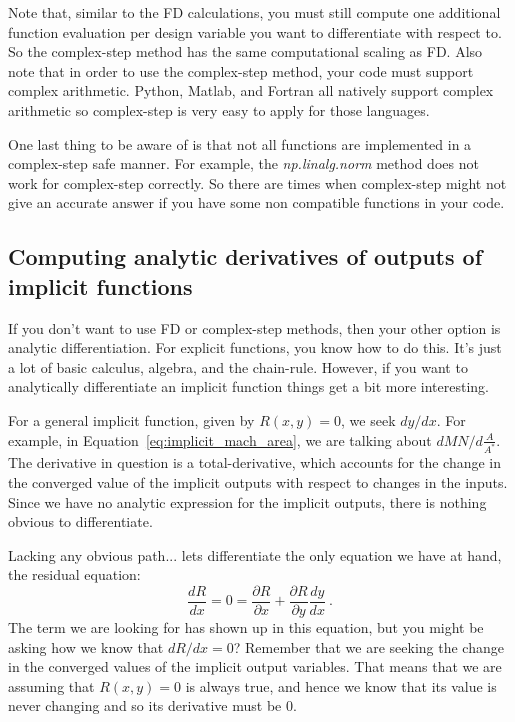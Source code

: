 \documentclass[conf]{new-aiaa}
\begin{document}
    Note that, similar to the FD calculations, you must still compute one additional function evaluation per design variable you want to differentiate with respect to. 
    So the complex-step method has the same computational scaling as FD. 
    Also note that in order to use the complex-step method, your code must support complex arithmetic. 
    Python, Matlab, and Fortran all natively support complex arithmetic so complex-step is very easy to apply for those languages. 

    One last thing to be aware of is that not all functions are implemented in a complex-step safe manner. 
    For example, the \textit{np.linalg.norm} method does not work for complex-step correctly. 
    So there are times when complex-step might not give an accurate answer if you have some non compatible functions in your code. 




    \subsection{Computing analytic derivatives of outputs of implicit functions}
    \label{subsec:analytic_deriv_implicit_function}

    If you don't want to use FD or complex-step methods, then your other option is analytic differentiation. 
    For explicit functions, you know how to do this.
    It's just a lot of basic calculus, algebra, and the chain-rule. 
    However, if you want to analytically differentiate an implicit function things get a bit more interesting. 

    For a general implicit function, given by $R(x,y)=0$, we seek $dy/dx$. 
    For example, in Equation~\eqref{eq:implicit_mach_area}, we are talking about $dMN/d\frac{A}{A^*}$. 
    The derivative in question is a total-derivative, which accounts for the change in the converged value of the implicit outputs with respect to changes in the inputs. 
    Since we have no analytic expression for the implicit outputs, there is nothing obvious to differentiate. 

    Lacking any obvious path... lets differentiate the only equation we have at hand, the residual equation: 
    \begin{equation}
        \frac{d R}{dx} = 0 = \frac{\partial R}{\partial x} + \frac{\partial R}{\partial y}\frac{dy}{dx}  \ . \label{eq:residual_total_deriv}
    \end{equation}
    The term we are looking for has shown up in this equation, but you might be asking how we know that $dR/dx=0$? 
    Remember that we are seeking the change in the converged values of the implicit output variables. 
    That means that we are assuming that $R(x,y)=0$ is always true, and hence we know that its value is never changing and so its derivative must be 0. 
\end{document}
